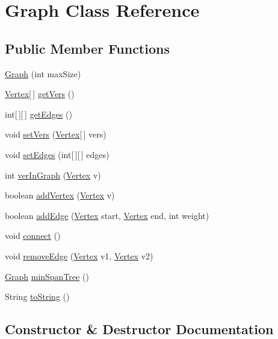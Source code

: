 \hypertarget{class_graph}{}\section{Graph Class Reference}
\label{class_graph}
\subsection*{Public Member Functions}
\begin{DoxyCompactItemize}
\item 
\hyperlink{class_graph_a3b41cdad7e5c5b479da2a4997b172ce1}{Graph} (int max\+Size)
\item 
\hyperlink{class_vertex}{Vertex}\mbox{[}$\,$\mbox{]} \hyperlink{class_graph_af46666375cb587dac0b9cb030c16a359}{get\+Vers} ()
\item 
int\mbox{[}$\,$\mbox{]}\mbox{[}$\,$\mbox{]} \hyperlink{class_graph_a252104f18213cb0f6e73487b26d22ef9}{get\+Edges} ()
\item 
void \hyperlink{class_graph_a9fa92fc6b57eb073390f5933689909df}{set\+Vers} (\hyperlink{class_vertex}{Vertex}\mbox{[}$\,$\mbox{]} vers)
\item 
void \hyperlink{class_graph_a0a5d1176c1e5096f098a1f49271270d3}{set\+Edges} (int\mbox{[}$\,$\mbox{]}\mbox{[}$\,$\mbox{]} edges)
\item 
int \hyperlink{class_graph_a3c51c040b54dfabf3f083f754928642f}{ver\+In\+Graph} (\hyperlink{class_vertex}{Vertex} v)
\item 
boolean \hyperlink{class_graph_ada66ac66d7a77f7a2b47ca33f7af5105}{add\+Vertex} (\hyperlink{class_vertex}{Vertex} v)
\item 
boolean \hyperlink{class_graph_a1d3e23f0b7be69dfcd3818e841cc6967}{add\+Edge} (\hyperlink{class_vertex}{Vertex} start, \hyperlink{class_vertex}{Vertex} end, int weight)
\item 
void \hyperlink{class_graph_aa58f9b45f4cd1b86169b7fc144175156}{connect} ()
\item 
void \hyperlink{class_graph_a00e73276d8291687bdfaf701ef32bb0c}{remove\+Edge} (\hyperlink{class_vertex}{Vertex} v1, \hyperlink{class_vertex}{Vertex} v2)
\item 
\hyperlink{class_graph}{Graph} \hyperlink{class_graph_a413b9997f5a2e850a78ad8f7aad89dab}{min\+Span\+Tree} ()
\item 
String \hyperlink{class_graph_a713307d8b2e43a9b717ca80f2d9fc8b0}{to\+String} ()
\end{DoxyCompactItemize}


\subsection{Constructor \& Destructor Documentation}
\hypertarget{class_graph_a3b41cdad7e5c5b479da2a4997b172ce1}{}
